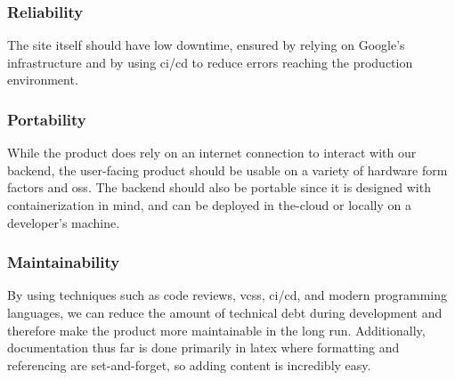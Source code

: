         \subsubsection{Reliability}\label{sec:reliability}
            The site itself should have low downtime, ensured by relying on Google's infrastructure and by using \gls{ci}/\gls{cd} to reduce errors reaching the production environment. 
        \subsubsection{Portability}\label{sec:portability}
            While the product does rely on an internet connection to interact with our backend, the user-facing product should be usable on a variety of hardware form factors and \glspl{os}. The backend should also be portable since it is designed with containerization in mind, and can be deployed in \gls{the-cloud} or locally on a developer's machine.
        \subsubsection{Maintainability}\label{sec:maintainability}
            By using techniques such as code reviews, \glspl{vcs}, \gls{ci}/\gls{cd}, and modern programming languages, we can reduce the amount of technical debt during development and therefore make the product more maintainable in the long run. Additionally, documentation thus far is done primarily in \gls{latex} where formatting and referencing are set-and-forget, so adding content is incredibly easy.

